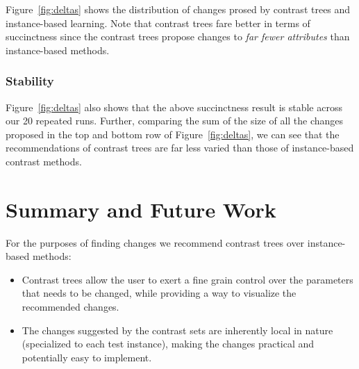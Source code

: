 \documentclass[conference]{IEEEtran}
\newcommand{\fig}[1]{Figure~\ref{fig:#1}}
\begin{document}
\fig{deltas} shows the distribution of changes prosed by contrast trees
and instance-based learning.  Note that contrast trees fare better in terms
of succinctness since the contrast trees propose changes to {\em far fewer attributes}
than instance-based methods.

\subsubsection{Stability}
\fig{deltas} also shows that the above succinctness result is stable across
our 20 repeated runs. Further, comparing the sum of  the size of all the changes proposed in the top and bottom row of \fig{deltas}, we can see that the recommendations of contrast trees are far less varied than those of instance-based contrast methods.
 
 \section{Summary and Future Work}
For the purposes of finding changes  we recommend
contrast trees over instance-based methods:
	
	\begin{itemize}
		\item Contrast trees allow the user to exert a fine grain control over the parameters that needs to be changed, while providing a way to visualize the recommended changes.
		\item The changes suggested by the contrast sets are inherently local in nature (specialized to each test instance), making the changes practical and potentially easy to implement.
	 
	\end{itemize}



 


\end{document}
